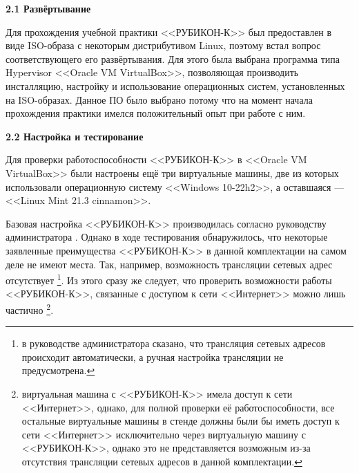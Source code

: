 \begin{center}
	\textbf{\Large 2.1 Развёртывание}
\end{center}

Для прохождения учебной практики <<РУБИКОН-К>> был предоставлен в виде ISO-образа с некоторым дистрибутивом Linux, поэтому встал вопрос соответствующего его развёртывания. Для этого была выбрана программа типа Hypervisor <<Oracle VM VirtualBox>>, позволяющая производить инсталляцию, настройку и использование операционных систем, установленных на ISO-образах. Данное ПО было выбрано потому что на момент начала прохождения практики имелся положительный опыт при работе с ним.

\begin{center}
	\textbf{\Large 2.2 Настройка и тестирование}
\end{center}

Для проверки работоспособности <<РУБИКОН-К>> в <<Oracle VM VirtualBox>> были настроены ещё три виртуальные машины, две из которых использовали операционную систему <<Windows 10-22h2>>, а оставшаяся --- <<Linux Mint 21.3 cinnamon>>.

Базовая настройка <<РУБИКОН-К>> производилась согласно руководству администратора \cite{doc}. Однако в ходе тестирования обнаружилось, что некоторые заявленные преимущества <<РУБИКОН-К>> в данной комплектации на самом деле не имеют места. Так, например, возможность трансляции сетевых адрес отсутствует \footnote{в руководстве администратора \cite{doc} сказано, что трансляция сетевых адресов происходит автоматически, а ручная настройка трансляции не предусмотрена.}. Из этого сразу же следует, что проверить возможности работы <<РУБИКОН-К>>, связанные с доступом к сети <<Интернет>> можно лишь частично \footnote{виртуальная машина с <<РУБИКОН-К>> имела доступ к сети <<Интернет>>, однако, для полной проверки её работоспособности, все остальные виртуальные машины в стенде должны были бы иметь доступ к сети <<Интернет>> исключительно через виртуальную машину с <<РУБИКОН-К>>, однако это не представляется возможным из-за отсутствия трансляции сетевых адресов в данной комплектации.}.

